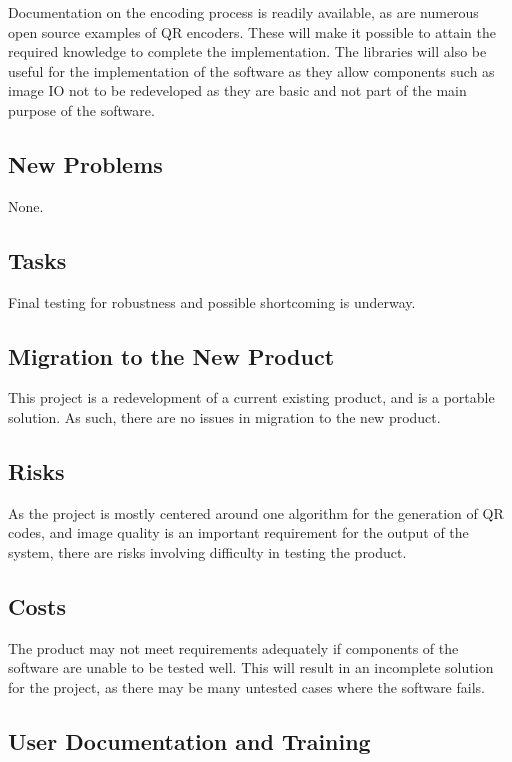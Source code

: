 \documentclass[12pt, titlepage]{article}
\begin{document}
	Documentation on the encoding process is readily available, as are numerous 
	open source examples of QR encoders. These will make it possible to attain 
	the required knowledge to complete the implementation. The libraries will 
	also be useful for the implementation of the software as they allow 
	components such as image IO not to be redeveloped as they are basic and not 
	part of the main purpose of the software.

\subsection{New Problems}

	None.

\subsection{Tasks}

	Final testing for robustness and possible shortcoming is underway.

\subsection{Migration to the New Product}

	This project is a redevelopment of a current existing product, and is a 
	portable solution. As such, there are no issues in migration to the new 
	product.

\subsection{Risks}

	As the project is mostly centered around one algorithm for the generation 
	of QR codes, and image quality is an important requirement for the output 
	of the system, there are risks involving difficulty in testing the product. 

\subsection{Costs}

	The product may not meet requirements adequately if components of the 
	software are unable to be tested well. This will result in an incomplete 
	solution for the project, as there may be many untested cases where the 
	software fails.

\subsection{User Documentation and Training}
\end{document}
